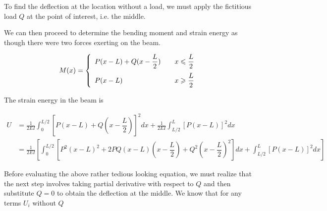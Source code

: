 \documentclass[
10pt,
a4paper,
openany,
svgnames,
]{book} %
\begin{document}
\begin{solution}
  To find the deflection at the location without a load, we must apply the fictitious load $Q$ at the point of interest, i.e. the middle.

   \begin{figure}[H]
    \centering
  \end{figure}

    We can then proceed to determine the bending moment and strain energy as though there were two forces exerting on the beam.
    
    \begin{align*}
      M(x) &= \left\{
      \begin{array}{l l l}
        P(x - L) + Q(x - \dfrac{L}{2}) & & x \leqslant \dfrac{L}{2} \\[1em]
        P(x - L) & & x \geqslant \dfrac{L}{2}
      \end{array} \right. \\
    \end{align*}

    The strain energy in the beam is

    \begin{align*}
      U &= \frac{1}{2EI} \int_0^{L/2} \left[ P(x - L) + Q(x - \dfrac{L}{2}) \right]^2dx + \frac{1}{2EI} \int_{L/2}^L \left[ P(x-L) \right]^2dx \\
        &= \frac{1}{2EI} \left[ \int_0^{L/2} \left[ P^2(x-L)^2 + 2PQ(x-L)(x-\dfrac{L}{2}) + Q^2(x - \dfrac{L}{2})^2 \right] dx +  \int_{L/2}^L \left[ P(x-L) \right]^2dx \right]
    \end{align*}

    Before evaluating the above rather tedious looking equation, we must realize that the next step involves taking partial derivative with respect to $Q$ and then substitute $Q = 0$ to obtain the deflection at the middle. We know that for any terms $U_i$ without $Q$


\end{solution}
\end{document}
